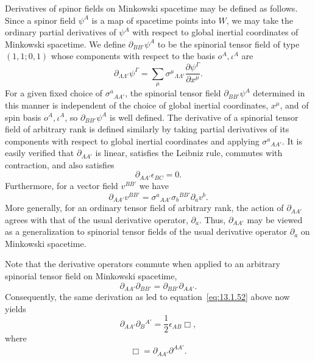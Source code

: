 Derivatives of spinor fields on Minkowski spacetime may be defined as follows. Since
a spinor field \(\psi^A\) is a map of spacetime points into \(W\), we may take the
ordinary partial derivatives of \(\psi^A\) with respect to global inertial coordinates
of Minkowski spacetime. We define \(\partial_{BB'}\psi^A\) to be the spinorial tensor
field of type \((1,1;0,1)\) whose components with respect to the basis
\(o^A,\iota^A\) are
\begin{equation}
  \partial_{\Lambda\Lambda'}\psi^\Gamma
  =\sum_\mu\sigma^\mu{}_{\Lambda\Lambda'}\frac{\partial\psi^\Gamma}{\partial x^\mu}.
  \tag{13.1.53}\label{eq:13.1.53}
\end{equation}
For a given fixed choice of \(\sigma^a{}_{AA'}\), the spinorial tensor field
\(\partial_{BB'}\psi^A\) determined in this manner is independent of the choice of
global inertial coordinates, \(x^\mu\), and of spin basis \(o^A,\iota^A\), so
\(\partial_{BB'}\psi^A\) is well defined. The derivative of a spinorial tensor field
of arbitrary rank is defined similarly by taking partial derivatives of its components
with respect to global inertial coordinates and applying \(\sigma^a{}_{AA'}\). It is
easily verified that \(\partial_{AA'}\) is linear, satisfies the Leibniz rule,
commutes with contraction, and also satisfies
\begin{equation}
  \partial_{AA'}\epsilon_{BC}=0.
  \tag{13.1.54}\label{eq:13.1.54}
\end{equation}
Furthermore, for a vector field \(v^{BB'}\) we have
\begin{equation}
  \partial_{AA'}v^{BB'}=
  \sigma^a{}_{AA'}\sigma_b{}^{BB'}\partial_av^b.
  \tag{13.1.55}\label{eq:13.1.55}
\end{equation}
More generally, for an ordinary tensor field of arbitrary rank, the action of
\(\partial_{AA'}\) agrees with that of the usual derivative operator, \(\partial_a\).
Thus, \(\partial_{AA'}\) may be viewed as a generalization to spinorial tensor fields
of the usual derivative operator \(\partial_a\) on Minkowski spacetime.

Note that the derivative operators commute when applied to an arbitrary spinorial
tensor field on Minkowski spacetime,
\begin{equation}
  \partial_{AA'}\partial_{BB'}=\partial_{BB'}\partial_{AA'}.
  \tag{13.1.56}\label{eq:13.1.56}
\end{equation}
Consequently, the same derivation as led to equation~\eqref{eq:13.1.52} above now
yields
\begin{equation}
  \partial_{AA'}\partial_B{}^{A'}=\frac12\epsilon_{AB}\Box,
  \tag{13.1.57}\label{eq:13.1.57}
\end{equation}
where
\begin{equation}
  \Box=\partial_{AA'}\partial^{AA'}.
  \tag{13.1.58}\label{eq:13.1.58}
\end{equation}

